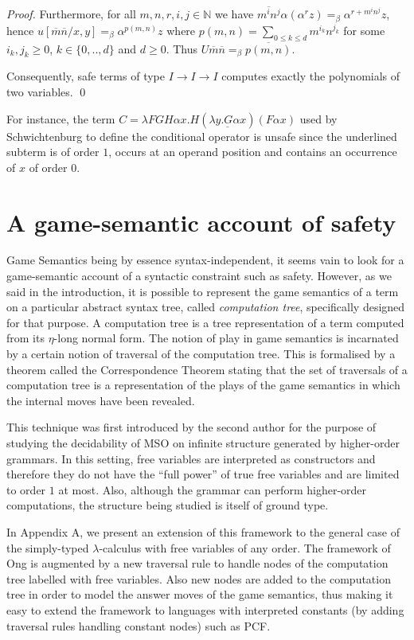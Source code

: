 \documentclass{llncs}
\newcommand{\encode}[1]{\overline{#1}} \newcommand\dps{\displaystyle}
\newcommand\nat{\mathbb{N}}
\newcommand\pcf{\textsf{PCF}}
\begin{document}
\begin{proof}
Furthermore, for all $m,n,r,i,j\in \nat$ 
we have $\encode{m^i n^j} \alpha (\alpha^r z) =_\beta
\alpha^{r + m^i n^j} z$,
hence $u[\encode{m} \encode{n}/x,y] =_\beta \alpha^{p(m,n)} z$ where $p(m,n) = \sum_{0\leq k \leq d} m^{i_k} n^{j_k}$ for some $i_k,j_k \geq 0$, $k \in\{ 0,..,d \}$ and $d\geq 0$.
Thus $U \encode{m} \encode{n} =_\beta \encode{p(m,n)}$. 

Consequently, safe terms of type $I \rightarrow I \rightarrow I$ computes
exactly the polynomials of two variables. \qed
\end{proof}

For instance, the term $ C = \lambda F G H \alpha x . H (
\underline{\lambda y . G \alpha x} ) (F \alpha x)$ used by
Schwichtenburg \cite{citeulike:622637} to define the conditional
operator is unsafe since the underlined subterm is of order $1$,
occurs at an operand position and contains an occurrence of $x$ of
order $0$.


\section{A game-semantic account of safety}
\label{sec:gamesemaccount}
Game Semantics being by essence syntax-independent, it seems vain to
look for a game-semantic account of a syntactic constraint such as
safety. However, as we said in the introduction, it is possible to
represent the game semantics of a term on a particular abstract syntax
tree, called \emph{computation tree}, specifically designed for that
purpose. A computation tree is a tree representation of a term
computed from its $\eta$-long normal form. The notion of play in game
semantics is incarnated by a certain notion of traversal of the
computation tree. This is formalised by a theorem called the
Correspondence Theorem stating that the set of traversals of a
computation tree is a representation of the plays of the game
semantics in which the internal moves have been revealed.

This technique was first introduced by the second author
\cite{OngLics2006} for the purpose of studying the decidability of MSO
on infinite structure generated by higher-order grammars. In this
setting, free variables are interpreted as constructors and therefore
they do not have the ``full power'' of true free variables and are
limited to order $1$ at most. Also, although the grammar can perform
higher-order computations, the structure being studied is itself of
ground type.

In Appendix A, we present an extension of this framework to the
general case of the simply-typed $\lambda$-calculus with free
variables of any order. The framework of Ong \cite{OngLics2006} is
augmented by a new traversal rule to handle nodes of the computation
tree labelled with free variables. Also new nodes are added to the
computation tree in order to model the answer moves of the game
semantics, thus making it easy to extend the framework to languages
with interpreted constants (by adding traversal rules handling
constant nodes) such as \pcf.
\end{document}
